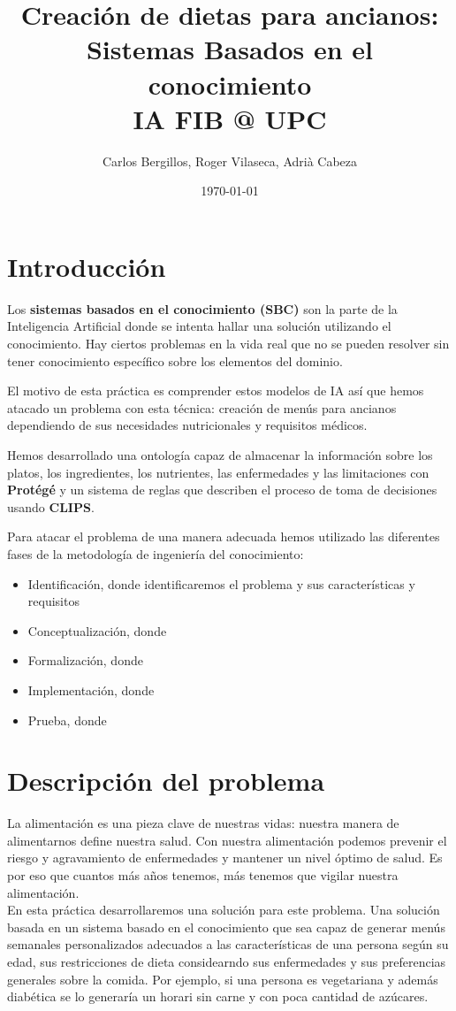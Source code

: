 \documentclass[12]{article}
\date{\today}
\author{Carlos Bergillos, Roger Vilaseca, Adrià Cabeza}
\title{Creación de dietas para ancianos: \\ Sistemas Basados en el conocimiento \\
	\large IA FIB @ UPC}
\begin{document}
\maketitle
\newpage
\tableofcontents
\newpage
\section{Introducción}
Los \textbf{sistemas basados en el conocimiento (SBC)} son la parte de la Inteligencia Artificial donde se intenta hallar una solución utilizando el conocimiento. Hay ciertos problemas en la vida real que no se pueden resolver sin tener conocimiento específico sobre los elementos del dominio. 
\par
El motivo de esta práctica es comprender estos modelos de IA así que hemos atacado un problema con esta técnica: creación de menús para ancianos dependiendo de sus necesidades nutricionales y requisitos médicos.
\par
Hemos desarrollado una ontología capaz de almacenar la información sobre los platos, los ingredientes, los nutrientes, las enfermedades y las limitaciones con \textbf{Protégé} y un sistema de reglas que describen el proceso de toma de decisiones usando \textbf{CLIPS}.
\par
Para atacar el problema de una manera adecuada hemos utilizado las diferentes fases de la metodología de ingeniería del conocimiento: 

\begin{itemize}
\item Identificación, donde identificaremos el problema y sus características y requisitos
\item Conceptualización, donde 
\item Formalización, donde
\item Implementación, donde
\item Prueba, donde
\end{itemize}

\section{Descripción del problema}
La alimentación es una pieza clave de nuestras vidas: nuestra manera de alimentarnos define nuestra salud. Con nuestra alimentación podemos prevenir el riesgo y agravamiento de enfermedades y mantener un nivel óptimo de salud. Es por eso que cuantos más años tenemos, más tenemos que vigilar nuestra alimentación.
\\
En esta práctica desarrollaremos una solución para este problema. Una solución basada en un sistema basado en el conocimiento que sea capaz de generar menús semanales personalizados adecuados a las características de una persona según su edad, sus restricciones de dieta considearndo sus enfermedades y sus preferencias generales sobre la comida. Por ejemplo, si una persona es vegetariana y además diabética se lo generaría un horari sin carne y con poca cantidad de azúcares. 
\end{document}
